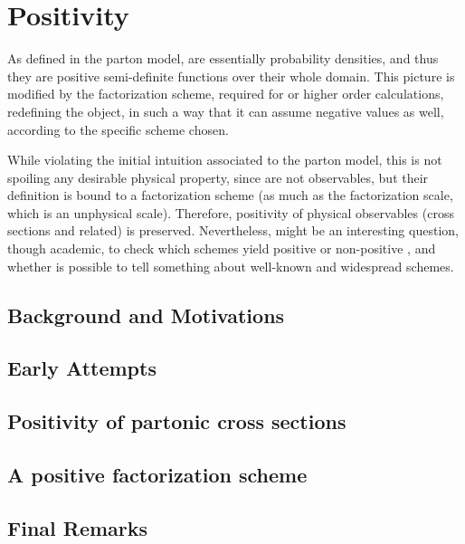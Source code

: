 
\chapter{Positivity}
\label{ch:pos}
\minitoc
\adjustmtc

As defined in the parton model, \pdf are essentially probability densities, and
thus they are positive semi-definite functions over their whole domain.
%
This picture is modified by the factorization scheme, required for \nlo or
higher order calculations, redefining the \pdf object, in such a way that it
can assume negative values as well, according to the specific scheme chosen.

While violating the initial intuition associated to the parton model, this is
not spoiling any desirable physical property, since \pdfs are not observables,
but their definition is bound to a factorization scheme (as much as the
factorization scale, which is an unphysical scale).
Therefore, positivity of physical observables (cross sections and related) is
preserved. 
%
Nevertheless, might be an interesting question, though academic, to check which
schemes yield positive or non-positive \pdf, and whether is possible to tell
something about well-known and widespread schemes.

\section{Background and Motivations}
\label{sec:pos/motiv}


\section{Early Attempts}
\label{sec:pos/early}


\section{Positivity of partonic cross sections}
\label{sec:pos/subtr}


\section{A positive factorization scheme}
\label{sec:pos/scheme}


\section{Final Remarks}
\label{sec:pos/conc}

